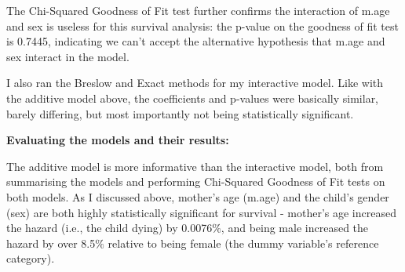 \documentclass[12pt,letterpaper]{article}
\begin{document}
\vspace{.25cm}

    \noindent The Chi-Squared Goodness of Fit test further confirms the interaction of m.age and sex is useless for this survival analysis: the p-value on the goodness of fit test is 0.7445, indicating we can't accept the alternative hypothesis that m.age and sex interact in the model.

\vspace{.25cm}

    I also ran the Breslow and Exact methods for my interactive model. Like with the additive model above, the coefficients and p-values were basically similar, barely differing, but most importantly not being statistically significant.

\vspace{.65cm}

\textbf{Evaluating the models and their results:}

\vspace{.2cm}

    \noindent The additive model is more informative than the interactive model, both from summarising the models and performing Chi-Squared Goodness of Fit tests on both models. As I discussed above, mother's age (m.age) and the child's gender (sex) are both highly statistically significant for survival - mother's age increased the hazard (i.e., the child dying) by 0.0076$\%$, and being male increased the hazard by over 8.5$\%$ relative to being female (the dummy variable's reference category).
\end{document}
